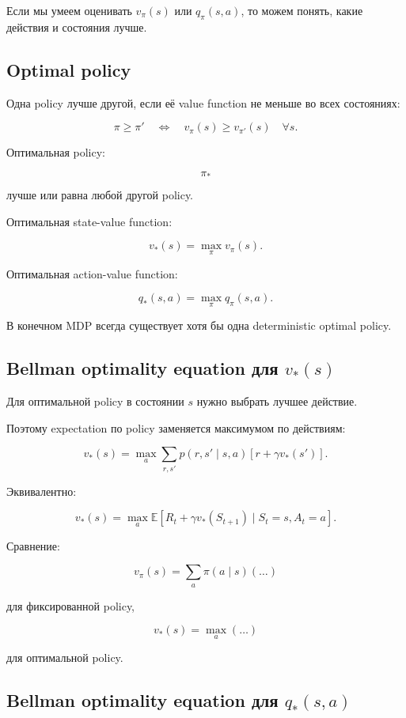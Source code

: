 \documentclass[a4paper,12pt]{article}
\begin{document}
Если мы умеем оценивать \(v_\pi(s)\) или \(q_\pi(s,a)\), то можем понять, какие действия и состояния лучше.

\subsection{Optimal policy}

Одна policy лучше другой, если её value function не меньше во всех состояниях:

\[
\pi \geq \pi'
\quad \Longleftrightarrow \quad
v_\pi(s) \geq v_{\pi'}(s)
\quad \forall s.
\]

Оптимальная policy:

\[
\pi_*
\]

лучше или равна любой другой policy.

Оптимальная state-value function:

\[
v_*(s)
=
\max_\pi v_\pi(s).
\]

Оптимальная action-value function:

\[
q_*(s,a)
=
\max_\pi q_\pi(s,a).
\]

В конечном MDP всегда существует хотя бы одна deterministic optimal policy.

\subsection{Bellman optimality equation для \(v_*(s)\)}

Для оптимальной policy в состоянии \(s\) нужно выбрать лучшее действие.

Поэтому expectation по policy заменяется максимумом по действиям:

\[
v_*(s)
=
\max_a
\sum_{r,s'}
p(r,s'\mid s,a)
\left[
r + \gamma v_*(s')
\right].
\]

Эквивалентно:

\[
v_*(s)
=
\max_a
\mathbb{E}
[
R_t + \gamma v_*(S_{t+1})
\mid S_t=s, A_t=a
].
\]

Сравнение:

\[
v_\pi(s)
=
\sum_a \pi(a\mid s)(\dots)
\]

для фиксированной policy,

\[
v_*(s)
=
\max_a(\dots)
\]

для оптимальной policy.

\subsection{Bellman optimality equation для \(q_*(s,a)\)}
\end{document}
